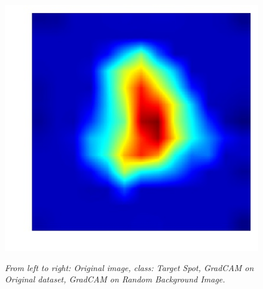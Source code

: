 \begin{figure}
\begin{center}
{			\includegraphics[scale=0.24]{./images/Target_Spot2normal_cam}
		}
	\end{center}
	\caption{\textit{From left to right: Original image, class: Target Spot, GradCAM on Original dataset, GradCAM on Random Background Image.}}
	\label{fig:gradcam}
	\label{fig:long}
	\label{fig:onecol}
	\vspace{-15pt}
\end{figure}